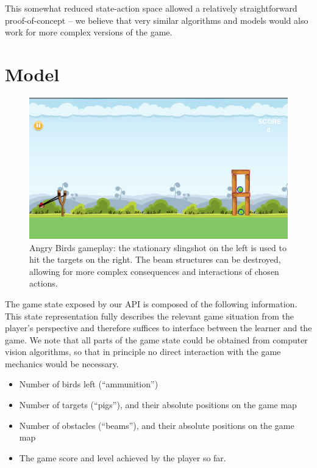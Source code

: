 \documentclass[fleqn,10pt]{SelfArx} %
\begin{document}
This somewhat reduced state-action space allowed a relatively straightforward proof-of-concept -- we believe that very similar algorithms and models would also work for more complex versions of the game.

\section{Model}

\begin{figure}[ht]\centering %
\includegraphics[width=\linewidth]{angry-birds-image.png}
\caption{Angry Birds gameplay: the stationary slingshot on the left is used to hit the targets on the right. The beam structures can be destroyed, allowing for more complex consequences and interactions of chosen actions.}
\label{fig:view}
\end{figure}

The game state exposed by our API is composed of the following information. This state representation fully describes the relevant game situation from the player’s perspective and therefore suffices to interface between the learner and the game. We note that all parts of the game state could be obtained from computer vision algorithms, so that in principle no direct interaction with the game mechanics would be necessary.
\begin{itemize}
\item Number of birds left (“ammunition”)
\item Number of targets (“pigs”), and their absolute positions on the game map
\item Number of obstacles (“beams”), and their absolute positions on the game map
\item The game score and level achieved by the player so far.
\end{itemize}
\end{document}
